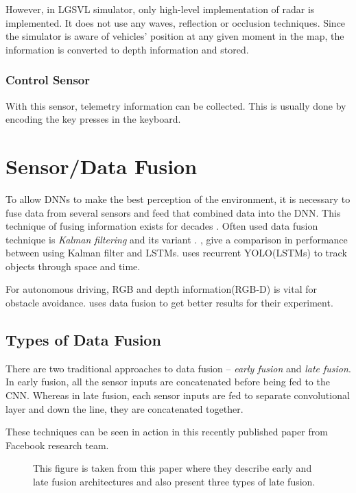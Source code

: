 However, in LGSVL simulator, only high-level implementation of radar is implemented. It
does not use any waves, reflection or occlusion techniques. Since the simulator is aware
of vehicles' position at any given moment in the map, the information is converted to
depth information and stored.

\subsubsection*{Control Sensor}
With this sensor, telemetry information can be collected. This is usually done by
encoding the key presses in the keyboard.

\section{Sensor/Data Fusion}
\label{sec:datafusion}
To allow DNNs to make the best perception of the environment, it is necessary to fuse data from
several sensors and feed that combined data into the DNN. This technique of fusing
information exists for decades \cite{Datafusion1}. Often used data fusion technique is
\textit{Kalman filtering} and its variant \cite{Datafusion3} \cite{Datafusion2}. \cite{kalmanfilterpaper1},
\cite{kalmanfilterpaper2} give a comparison in performance between using Kalman filter and
LSTMs. \cite{kalmanfilterpaper3} uses recurrent YOLO(LSTMs) to track objects through space and time.

For autonomous driving, RGB and depth information(RGB-D) is vital for obstacle avoidance.
\cite{XiaoCodevillaMultimodalE2E} uses data fusion to get better results for their
experiment.
\subsection{Types of Data Fusion}
There are two traditional approaches to data fusion -- \textit{early fusion} and
\textit{late fusion}.
In early fusion, all the sensor inputs are concatenated before being fed to the CNN.
Whereas in late fusion, each sensor inputs are fed to separate convolutional layer and
down the line, they are concatenated together.

These techniques can be seen in action in this \cite{wang2020makes} recently
published paper from Facebook research team.
\begin{figure}[!ht]
	\begin{center}
        \def\svgwidth{\textwidth}
        
	\end{center}
    \caption{This figure is taken from this \cite{Datafusion4} paper where they describe early and
        late fusion architectures and also present three types of late fusion.}
    \label{fig:Datafusiontypes}
\end{figure}


